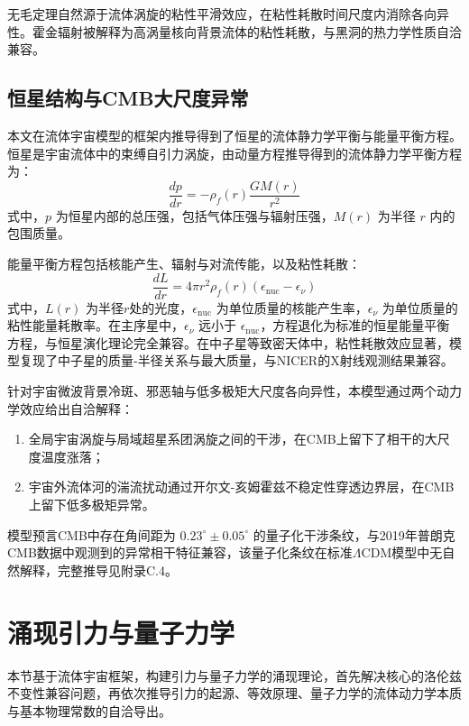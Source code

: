 \documentclass[aps,prd,preprint,superscriptaddress,floatfix]{revtex4-2}
\begin{document}
无毛定理自然源于流体涡旋的粘性平滑效应，在粘性耗散时间尺度内消除各向异性。霍金辐射被解释为高涡量核向背景流体的粘性耗散，与黑洞的热力学性质自洽兼容。

\subsection{恒星结构与CMB大尺度异常}
本文在流体宇宙模型的框架内推导得到了恒星的流体静力学平衡与能量平衡方程。恒星是宇宙流体中的束缚自引力涡旋，由动量方程推导得到的流体静力学平衡方程为：
\begin{equation}
\frac{d p}{d r}=-\rho_{f}(r) \frac{G M(r)}{r^{2}}
\label{eq:hydrostatic}
\end{equation}
式中，$p$ 为恒星内部的总压强，包括气体压强与辐射压强，$M(r)$ 为半径 $r$ 内的包围质量。

能量平衡方程包括核能产生、辐射与对流传能，以及粘性耗散：
\begin{equation}
\frac{d L}{d r}=4 \pi r^{2} \rho_{f}(r)\left(\epsilon_{\mathrm{nuc}}-\epsilon_{\nu}\right)
\label{eq:energy_balance}
\end{equation}
式中，$L(r)$ 为半径$r$处的光度，$\epsilon_{\mathrm{nuc}}$ 为单位质量的核能产生率，$\epsilon_{\nu}$ 为单位质量的粘性能量耗散率。在主序星中，$\epsilon_{\nu}$ 远小于 $\epsilon_{\mathrm{nuc}}$，方程退化为标准的恒星能量平衡方程，与恒星演化理论完全兼容。在中子星等致密天体中，粘性耗散效应显著，模型复现了中子星的质量-半径关系与最大质量，与NICER的X射线观测结果兼容。

针对宇宙微波背景冷斑、邪恶轴与低多极矩大尺度各向异性，本模型通过两个动力学效应给出自洽解释：
\begin{enumerate}
    \item 全局宇宙涡旋与局域超星系团涡旋之间的干涉，在CMB上留下了相干的大尺度温度涨落；
    \item 宇宙外流体河的湍流扰动通过开尔文-亥姆霍兹不稳定性穿透边界层，在CMB上留下低多极矩异常。
\end{enumerate}

模型预言CMB中存在角间距为 $0.23^\circ \pm 0.05^\circ$ 的量子化干涉条纹，与2019年普朗克CMB数据中观测到的异常相干特征兼容，该量子化条纹在标准$\Lambda$CDM模型中无自然解释，完整推导见附录C.4。

\section{涌现引力与量子力学}
本节基于流体宇宙框架，构建引力与量子力学的涌现理论，首先解决核心的洛伦兹不变性兼容问题，再依次推导引力的起源、等效原理、量子力学的流体动力学本质与基本物理常数的自洽导出。
\end{document}

